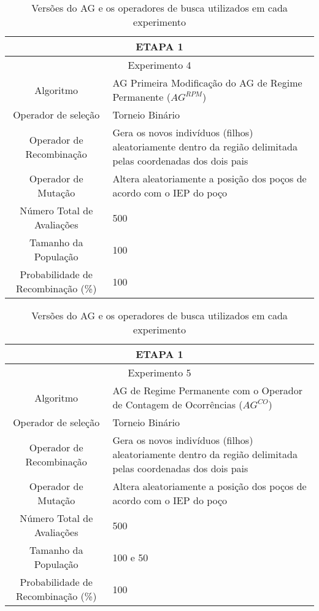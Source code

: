  \begin{table}[H]
\centering
\caption{Versões do AG e os operadores de busca utilizados em cada experimento}

\begin{tabular}{|c|p{10cm}|}
 \hline
  \multicolumn{2}{|c|}{ETAPA 1} \\ \hline
  \multicolumn{2}{|c|}{Experimento 4} \\ \hline
{Algoritmo} & AG Primeira Modificação do AG de Regime Permanente ($AG^{RPM}$) \\ \hline
 Operador de seleção & Torneio Binário \\ \hline
 Operador de Recombinação & Gera os novos indivíduos (filhos) aleatoriamente dentro da região delimitada pelas coordenadas dos dois pais \\  \hline
 Operador de Mutação & Altera aleatoriamente a posição dos poços de acordo com o IEP do poço \\ \hline
 Número Total de Avaliações & 500 \\ \hline
 Tamanho da População & 100 \\ \hline
 Probabilidade de Recombinação (\%) & 100 \\ \hline
 
 
 
\end{tabular}
\end{table} 
 
 \begin{table}[H]
\centering
\caption{Versões do AG e os operadores de busca utilizados em cada experimento}

\begin{tabular}{|c|p{10cm}|}
 \hline
  \multicolumn{2}{|c|}{ETAPA 1} \\ \hline
  \multicolumn{2}{|c|}{Experimento 5} \\ \hline
{Algoritmo} &AG de Regime Permanente com o Operador de Contagem de Ocorrências ($AG^{CO}$) \\ \hline
 Operador de seleção & Torneio Binário \\ \hline
 Operador de Recombinação & Gera os novos indivíduos (filhos) aleatoriamente dentro da região delimitada pelas coordenadas dos dois pais \\  \hline
 Operador de Mutação & Altera aleatoriamente a posição dos poços de acordo com o IEP do poço \\ \hline
 Número Total de Avaliações & 500 \\ \hline
 Tamanho da População & 100 e 50 \\ \hline
 Probabilidade de Recombinação (\%) & 100 \\ \hline
 
 
\end{tabular}
\end{table} 
 
